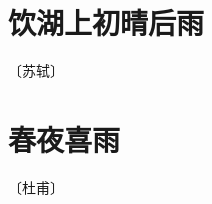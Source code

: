 \documentclass[12pt,UTF-8,openany]{ctexbook}
\begin{document}
\vspace{8pt}


\section{饮湖上初晴后雨}

\begin{center}
    \vspace{10pt}
    
    \begin{normalsize}
        
        〔苏轼〕
        
    \end{normalsize}
    
    \vspace{8pt}
    
    \begin{large}
        
        
        
    \end{large}
    
\end{center}

\vspace{8pt}


\section{春夜喜雨}

\begin{center}
    \vspace{10pt}
    
    \begin{normalsize}
        
        〔杜甫〕
        
    \end{normalsize}
    
    \vspace{8pt}
    
    \begin{large}
        
        
        
        
        
    \end{large}
    
\end{center}
\end{document}
